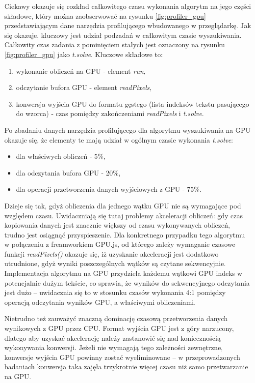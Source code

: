 Ciekawy okazuje się rozkład całkowitego czasu wykonania algorytm na jego części składowe, który można zaobserwować na rysunku \ref{fig:profiler_gpu} przedstawiającym dane narzędzia profilującego wbudowanego w przeglądarkę. Jak się okazuje, kluczowy jest udział podzadań w całkowitym czasie wyszukiwania. Całkowity czas zadania z pominięciem stałych jest oznaczony na rysunku \ref{fig:profiler_gpu} jako \textit{t.solve}. Kluczowe składowe to: 
\begin{enumerate}
    \item wykonanie obliczeń na GPU - element \textit{run},
    \item odczytanie bufora GPU - element \textit{readPixels},
    \item konwersja wyjścia GPU do formatu gęstego (lista indeksów tekstu pasującego do wzorca) - czas pomiędzy zakończeniami \textit{readPixels} i \textit{t.solve}.
\end{enumerate}
Po zbadaniu danych narzędzia profilującego dla algorytmu wyszukiwania na GPU okazuje się, że elementy te mają udział w ogólnym czasie wykonania \textit{t.solve}:
\begin{itemize}
    \item dla właściwych obliczeń - 5\%,
    \item dla odczytania bufora GPU - 20\%,
    \item dla operacji przetworzenia danych wyjściowych z GPU - 75\%.
\end{itemize}
Dzieje się tak, gdyż obliczenia dla jednego wątku GPU nie są wymagające pod względem czasu. Uwidaczniają się tutaj problemy akceleracji obliczeń: gdy czas kopiowania danych jest znacznie większy od czasu wykonywanych obliczeń, trudno jest osiągnąć przyspieszenie. Dla konkretnego przypadku tego algorytmu w połączeniu z freamworkiem GPU.js, od którego zależy wymaganie czasowe funkcji \textit{readPixels()} okazuje się, iż uzyskanie akceleracji jest dodatkowo utrudnione, gdyż wyniki poszczególnych wątków są czytane sekwencyjnie. Implementacja algorytmu na GPU przydziela każdemu wątkowi GPU indeks w potencjalnie dużym tekście, co sprawia, że wyników do sekwencyjnego odczytania jest dużo -- uwidacznia się to w stosunku czasów wykonania 4:1 pomiędzy operacją odczytania wyników GPU, a właściwymi obliczeniami.

Nietrudno też zauważyć znaczną dominację czasową przetworzenia danych wynikowych z GPU przez CPU. Format wyjścia GPU jest z góry narzucony, dlatego aby uzyskać akcelerację należy zastanowić się nad koniecznością wykonywania konwersji. Jeżeli nie wymagają tego zależności zewnętrzne, konwersje wyjścia GPU powinny zostać wyeliminowane -- w przeprowadzonych badaniach konwersja taka zajęła trzykrotnie więcej czasu niż samo przetwarzanie na GPU.

